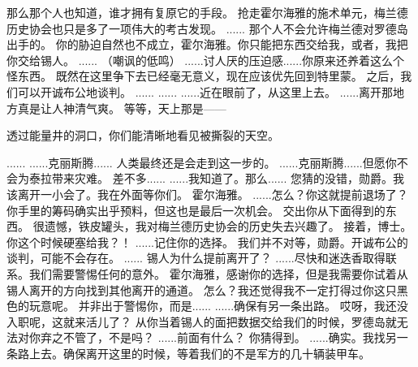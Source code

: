 \documentclass[openany]{book}
\begin{document}
\begin{dialogue}
     那么那个人也知道，谁才拥有复原它的手段。
     抢走霍尔海雅的施术单元，梅兰德历史协会也只是多了一项伟大的考古发现。
     ......
     那个人不会允许梅兰德对罗德岛出手的。
     你的胁迫自然也不成立，霍尔海雅。你只能把东西交给我，或者，我把你交给锡人。
     ......
     （嘲讽的低鸣）
     ......讨人厌的压迫感......你原来还养着这么个怪东西。
     既然在这里争下去已经毫无意义，现在应该优先回到特里蒙。
     之后，我们可以开诚布公地谈判。
     ......
     ......
     ......近在眼前了，从这里上去。
     ......离开那地方真是让人神清气爽。
     等等，天上那是——
\end{dialogue}\par

透过能量井的洞口，你们能清晰地看见被撕裂的天空。

\begin{dialogue}
     ......
     ......克丽斯腾......
     人类最终还是会走到这一步的。
     ......克丽斯腾......但愿你不会为泰拉带来灾难。
     差不多......
     ......我知道了。那么......
     您猜的没错，勋爵。我该离开一小会了。我在外面等你们。
     霍尔海雅。
     ......怎么？你这就提前退场了？
     你手里的筹码确实出乎预料，但这也是最后一次机会。
     交出你从下面得到的东西。
     很遗憾，铁皮罐头，我对梅兰德历史协会的历史失去兴趣了。
     接着，博士。
     你这个时候硬塞给我？！
     ......记住你的选择。
     我们并不对等，勋爵。开诚布公的谈判，可能不会存在。
     ......
     锡人为什么提前离开了？
     ......尽快和迷迭香取得联系。我们需要警惕任何的意外。
     霍尔海雅，感谢你的选择，但是我需要你试着从锡人离开的方向找到其他离开的通道。
     怎么？我还觉得我不一定打得过你这只黑色的玩意呢。
     并非出于警惕你，而是......
     ......确保有另一条出路。
     哎呀，我还没入职呢，这就来活儿了？
     从你当着锡人的面把数据交给我们的时候，罗德岛就无法对你弃之不管了，不是吗？
     ......前面有什么？
     你猜得到。
     ......确实。我找另一条路上去。确保离开这里的时候，等着我们的不是军方的几十辆装甲车。
\end{dialogue}\par
\end{document}
